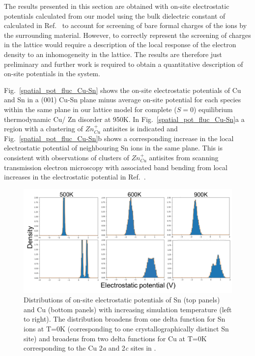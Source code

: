 \documentclass[11pt, twoside]{report}
\begin{document}
The results presented in this section are obtained with on-site electrostatic potentials calculated from our model using the bulk dielectric constant of {\CZTS} calculated in Ref.~\cite{Sunghyun_dielectric} to account for screening of bare formal charges of the ions by the surrounding material. However, to correctly represent the screening of charges in the lattice would require a description of the local response of the electron density to an inhomogeneity in the lattice. The results are therefore just preliminary and further work is required to obtain a quantitative description of on-site potentials in the system.

Fig.~\ref{spatial_pot_fluc_Cu-Sn} shows the on-site electrostatic potentials of Cu and Sn in a (001) Cu-Sn plane minus average on-site potential for each species within the same plane in our {\CZTS} lattice model for complete ($S=0$) equilibrium thermodynamic Cu/ Zn disorder at 950K. In Fig.~\ref{spatial_pot_fluc_Cu-Sn}a a region with a clustering of $Zn_{Cu}^{+}$ antisites is indicated and Fig.~\ref{spatial_pot_fluc_Cu-Sn}b shows a corresponding increase in the local electrostatic potential of neighbouring Sn ions in the same plane. This is consistent with observations of clusters of $Zn_{Cu}^{+}$ antisites from scanning transmission electron microscopy with associated band bending from local increases in the electrostatic potential in Ref.~.

\begin{figure}[]
  \centering
    \includegraphics[width=1.0\textwidth]{figures/pot_dists.png}
    \caption{Distributions of on-site electrostatic potentials of Sn (top panels) and Cu (bottom panels) with increasing simulation temperature (left to right). The distribution broadens from one delta function for Sn ions at T=0K (corresponding to one crystallographically distinct Sn site) and broadens from two delta functions for Cu at T=0K corresponding to the Cu 2\textit{a} and 2\textit{c} sites in {\CZTS}.}
  \label{pot_dists}
\end{figure}
\end{document}

